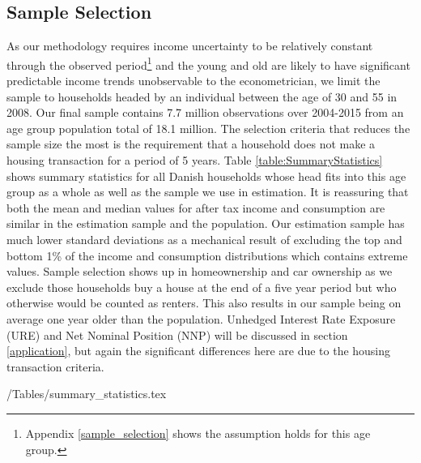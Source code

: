 \documentclass[titlepage]{\econtex}\newcommand{\texname}{ConsumptionHeterogeneity}
\begin{document}
\subsection{Sample Selection}
As our methodology requires income uncertainty to be relatively constant through the observed period\footnote{Appendix \ref{sample_selection} shows the assumption holds for this age group.} and the young and old are likely to have significant predictable income trends unobservable to the econometrician, we limit the sample to households headed by an individual between the age of 30 and 55 in 2008. Our final sample contains 7.7 million observations over 2004-2015 from an age group population total of 18.1 million. The selection criteria that reduces the sample size the most is the requirement that a household does not make a housing transaction for a period of 5 years. Table \ref{table:SummaryStatistics} shows summary statistics for all Danish households whose head fits into this age group as a whole as well as the sample we use in estimation. It is reassuring that both the mean and median values for after tax income and consumption are similar in the estimation sample and the population. Our estimation sample has much lower standard deviations as a mechanical result of excluding the top and bottom 1\% of the income and consumption distributions which contains extreme values. Sample selection shows up in homeownership and car ownership as we exclude those households buy a house at the end of a five year period but who otherwise would be counted as renters. This also results in our sample being on average one year older than the population. Unhedged Interest Rate Exposure (URE) and Net Nominal Position (NNP) will be discussed in section \ref{application}, but again the significant differences here are due to the housing transaction criteria. 
\begin{center} 
	\label{table:SummaryStatistics}
	\econtexRoot/Tables/summary_statistics.tex 
\end{center}
\end{document}
